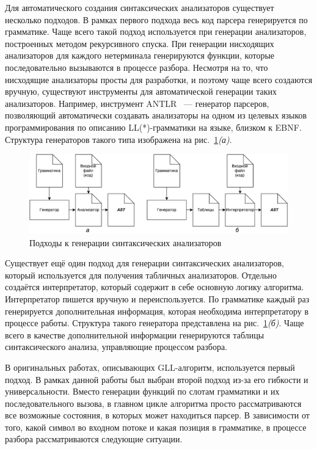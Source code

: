 Для автоматического создания синтаксических анализаторов существует несколько подходов. В рамках первого подхода весь код парсера генерируется по грамматике. Чаще всего такой подход используется при генерации анализаторов, построенных методом рекурсивного спуска. При генерации нисходящих анализаторов для каждого нетерминала генерируются функции, которые последовательно вызываются в процессе разбора. Несмотря на то, что нисходящие анализаторы просты для разработки, и поэтому чаще всего создаются вручную, существуют инструменты для автоматической генерации таких анализаторов. Например, инструмент ANTLR~\cite{antlr} --- генератор парсеров, позволяющий автоматически создавать анализаторы на одном из целевых языков программирования по описанию LL(*)-грамматики на языке, близком к EBNF. Структура генераторов такого типа изображена на рис.~\ref{genTypes}{\it (а)}.

\begin{figure}
 \centering
 \includegraphics[width=\textwidth]{Ragozina/pics/GeneratorTypes.pdf}
 \caption{Подходы к генерации синтаксических анализаторов}
 \label{genTypes}
\end{figure}

Существует ещё один подход для генерации синтаксических анализаторов, который используется для получения табличных анализаторов. Отдельно создаётся интерпретатор, который содержит в себе основную логику алгоритма. Интерпретатор пишется вручную и переиспользуется. По грамматике каждый раз генерируется дополнительная информация, которая необходима интерпретатору в процессе работы. Структура такого генератора представлена на рис.~\ref{genTypes}{\it (б)}. Чаще всего в качестве дополнительной информации генерируются таблицы синтаксического анализа, управляющие процессом разбора.

В оригинальных работах, описывающих GLL-алгоритм, используется первый подход. В рамках данной работы был выбран второй подход из-за его гибкости и универсальности. Вместо генерации функций по слотам грамматики и их последовательного вызова, в главном цикле алгоритма просто рассматриваются все возможные состояния, в которых может находиться парсер. В зависимости от того, какой символ во входном потоке и какая позиция в грамматике, в процессе разбора рассматриваются следующие ситуации.

